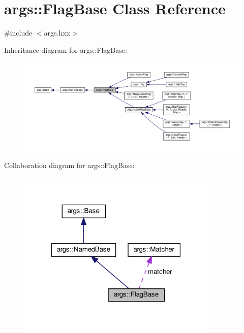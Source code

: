 \hypertarget{classargs_1_1_flag_base}{}\section{args\+:\+:Flag\+Base Class Reference}
\label{classargs_1_1_flag_base}


{\ttfamily \#include $<$args.\+hxx$>$}



Inheritance diagram for args\+:\+:Flag\+Base\+:\nopagebreak
\begin{figure}[H]
\begin{center}
\leavevmode
\includegraphics[width=350pt]{classargs_1_1_flag_base__inherit__graph}
\end{center}
\end{figure}


Collaboration diagram for args\+:\+:Flag\+Base\+:\nopagebreak
\begin{figure}[H]
\begin{center}
\leavevmode
\includegraphics[width=270pt]{classargs_1_1_flag_base__coll__graph}
\end{center}
\end{figure}
